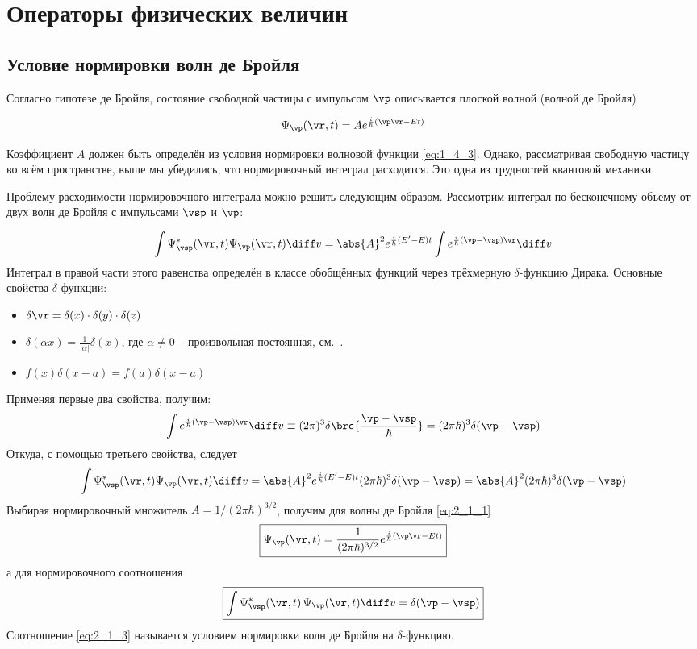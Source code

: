 \chapter{Операторы физических величин}

\section{Условие нормировки волн де Бройля}

Согласно гипотезе де Бройля, состояние свободной частицы с импульсом $\vp$ описывается плоской волной (волной де Бройля)

\begin{equation}
\label{eq:2_1_1}
\Psi_{\vp}(\vr,t) = A e^{\frac{i}{\hbar}(\vp\vr-Et)}
\end{equation}


Коэффициент $A$ должен быть определён из условия нормировки волновой функции \eqref{eq:1_4_3}. Однако, рассматривая свободную частицу во всём пространстве, выше мы убедились, что нормировочный интеграл расходится. Это одна из трудностей квантовой механики.

Проблему расходимости нормировочного интеграла можно решить следующим образом. Рассмотрим интеграл по бесконечному объему от двух волн де Бройля с импульсами $\vsp$ и $\vp$:

$$
\int \Psi^*_{\vsp}(\vr,t) \Psi_{\vp}(\vr,t)\diff v = 
  \abs{A}^2 e^{\frac{i}{\hbar}(E' - E)t} \int e^{\frac{i}{\hbar}(\vp - \vsp)\vr}\diff v
$$%
%
Интеграл в правой части этого равенства определён в классе обобщённых функций через трёхмерную $\delta$-функцию Дирака\footnotemark. Основные свойства $\delta$-функции:
%
\begin{itemize}
\item $\delta {\vr} = \delta (x) \cdot \delta (y) \cdot \delta (z) $
\item $\delta (\alpha x) = \frac{1}{|\alpha|} \delta (x)$, где $\alpha \ne 0$ -- произвольная постоянная, см.~.
\item $f(x) \delta (x - a) = f(a) \delta(x-a)$
\end{itemize}%
%
Применяя первые два свойства, получим:
$$
\int e^{\frac{i}{\hbar}(\vp - \vsp)\vr}\diff v \equiv
  (2 \pi )^3 \delta \brc{\frac{\vp - \vsp}{\hbar}} =
  (2 \pi \hbar)^3 \delta (\vp - \vsp)
$$%
%
Откуда, с помощью третьего свойства, следует
$$
\int \Psi^*_{\vsp}(\vr,t) \Psi_{\vp}(\vr,t)\diff v = 
  \abs{A}^2 e^{\frac{i}{\hbar}(E' - E)t} (2 \pi \hbar)^3 \delta (\vp - \vsp) =
  \abs{A}^2 (2 \pi \hbar)^3 \delta (\vp - \vsp)
$$%
%
Выбирая нормировочный множитель $A = 1/(2 \pi \hbar)^{3/2}$, получим для волны де Бройля \eqref{eq:2_1_1}%
%
\begin{equation}
\label{eq:2_1_2}
\boxed{\Psi_{\vp}(\vr,t) = \frac{1}{(2 \pi \hbar)^{3/2}} e^{\frac{i}{\hbar} (\vp \vr - Et)}}
\end{equation}%
%
а для нормировочного соотношения
\begin{equation}
\label{eq:2_1_3}
\boxed{\int\Psi^*_{\vsp}(\vr,t) \, \Psi_{\vp}(\vr,t)\diff v = \delta (\vp - \vsp)}
\end{equation}%
%
Соотношение \eqref{eq:2_1_3} называется условием нормировки волн де Бройля на $\delta$-функцию.

